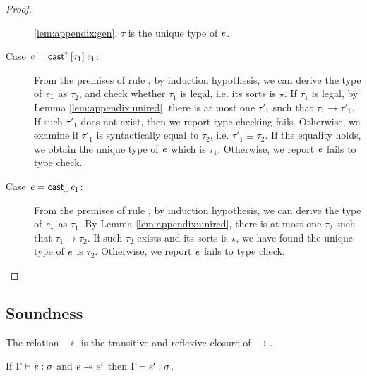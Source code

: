 \begin{proof}
\begin{description}
\ref{lem:appendix:gen}, $\tau$ is the unique type of $\mathit{e}$.
		\item[Case $\mathit{e}=\mathsf{cast}^{\uparrow} \, [  \tau_{{\mathrm{1}}}  ] \,  \mathit{e_{{\mathrm{1}}}}$:] From the premises of rule
, by induction hypothesis, we can derive the type of
$\mathit{e_{{\mathrm{1}}}}$ as $\tau_{{\mathrm{2}}}$, and check whether $\tau_{{\mathrm{1}}}$ is legal, i.e. its sorts is
$\star$. If $\tau_{{\mathrm{1}}}$ is legal, by Lemma \ref{lem:appendix:unired}, there is
at most one $\tau'_{{\mathrm{1}}}$ such that $\tau_{{\mathrm{1}}}  \longrightarrow  \tau'_{{\mathrm{1}}}$. If such $\tau'_{{\mathrm{1}}}$ does not
exist, then we report type checking fails. Otherwise, we examine if $\tau'_{{\mathrm{1}}}$
is syntactically equal to $\tau_{{\mathrm{2}}}$, i.e. $\tau'_{{\mathrm{1}}}  \equiv  \tau_{{\mathrm{2}}}$. If the equality
holds, we obtain the unique type of $\mathit{e}$ which is $\tau_{{\mathrm{1}}}$. Otherwise, we
report $\mathit{e}$ fails to type check.
		\item[Case $\mathit{e}=\mathsf{cast}_{\downarrow} \, \mathit{e_{{\mathrm{1}}}}$:] From the premises of rule
, by induction hypothesis, we can derive the type of
$\mathit{e_{{\mathrm{1}}}}$ as $\tau_{{\mathrm{1}}}$. By Lemma \ref{lem:appendix:unired}, there is at most one
$\tau_{{\mathrm{2}}}$ such that $\tau_{{\mathrm{1}}}  \longrightarrow  \tau_{{\mathrm{2}}}$. If such $\tau_{{\mathrm{2}}}$ exists and its sorts is
$\star$, we have found the unique type of $\mathit{e}$ is $\tau_{{\mathrm{2}}}$. Otherwise, we
report $\mathit{e}$ fails to type check.
	\end{description}
\end{proof}

\subsection{Soundness}
\begin{dfn}
    The relation $ \twoheadrightarrow $ is the transitive and reflexive closure of
$ \longrightarrow $.
\end{dfn}

\begin{lem}
If $\Gamma  \vdash  \mathit{e}  :  \sigma$ and $\mathit{e}  \twoheadrightarrow  e'$ then $\Gamma  \vdash  \mathit{e'}  :  \sigma$.
\end{lem}

